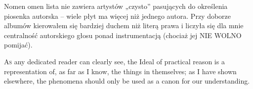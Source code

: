 
Nomen omen lista nie zawiera artystów „czysto” pasujących do określenia piosenka autorska -- wiele płyt ma
więcej niż jednego autora. Przy doborze albumów kierowałem się bardziej duchem niż literą prawa i liczyła się
dla mnie centralność autorskiego głosu ponad instrumentacją (chociaż jej NIE WOLNO pomijać).

\przerwa

\lettrine{A}{s} any dedicated reader can clearly see, the Ideal of practical reason is a representation of,
as far as I know, the things in themselves; as I have shown elsewhere, the phenomena should only be used as a
canon for our understanding. \kant[1][2-8]

\kant[2-4]
